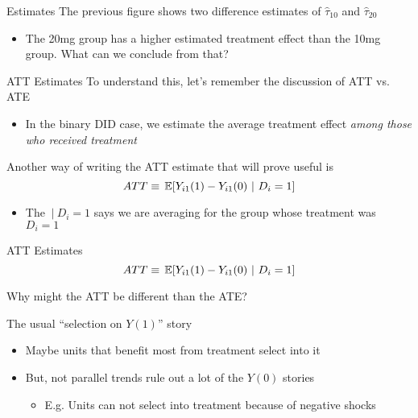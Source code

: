 \documentclass[aspectratio=43,t]{beamer}
\begin{document}
\begin{frame}{Estimates}
  The previous figure shows two difference estimates of $\hat{\tau}_{10}$ and $\hat{\tau}_{20}$
  \begin{itemize}
    \item The 20mg group has a higher estimated treatment effect than the 10mg group. What can we conclude from that?
  \end{itemize}
\end{frame}

\begin{frame}{ATT Estimates}
  To understand this, let's remember the discussion of ATT vs. ATE

  \begin{itemize}
    \item In the binary DID case, we estimate the average treatment effect \emph{among those who received treatment}
  \end{itemize}

  \bigskip
  Another way of writing the ATT estimate that will prove useful is
  $$
    ATT \equiv \expec{Y_{i1}(1) - Y_{i1}(0)}{D_i = 1}
  $$

  \begin{itemize}
    \item The $\ |\ D_i = 1$ says we are averaging for the group whose treatment was $D_i = 1$
  \end{itemize}
\end{frame}

\begin{frame}{ATT Estimates}
  \vspace{-\bigskipamount}
  $$
    ATT \equiv \expec{Y_{i1}(1) - Y_{i1}(0)}{D_i = 1}
  $$

  \bigskip
  Why might the ATT be different than the ATE?

  \pause
  \bigskip
  The usual ``selection on $Y(1)$'' story
  \begin{itemize}
    \item Maybe units that benefit most from treatment select into it

    \pause
    \item But, not parallel trends rule out a lot of the $Y(0)$ stories
    \begin{itemize}
      \item E.g. Units can not select into treatment because of negative shocks
    \end{itemize}
  \end{itemize}
\end{frame}
\end{document}
